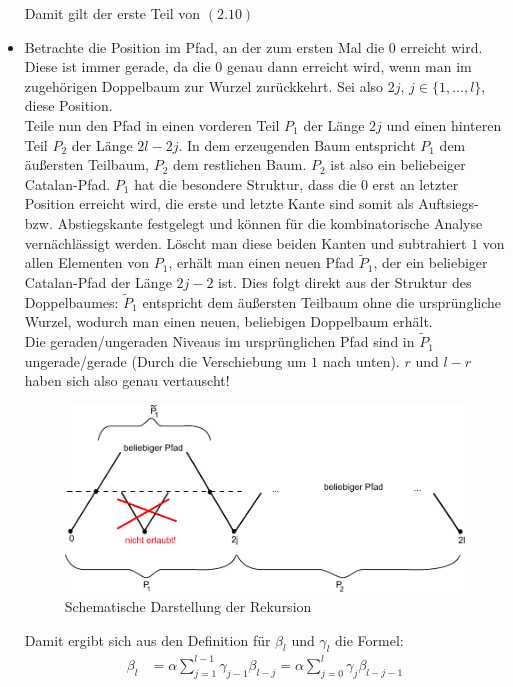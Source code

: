 \documentclass[a4paper, 11pt]{scrreprt}
\begin{document}
\begin{itemize}
Damit gilt der erste Teil von \((2.10)\)\\
\item
Betrachte die Position im Pfad, an der zum ersten Mal die \(0\) erreicht wird. Diese ist immer gerade, da die \(0\) genau dann erreicht wird, wenn man im zugehörigen Doppelbaum zur Wurzel zurückkehrt. Sei also \(2j\), \(j\in\{1,...,l\}\), diese Position. \\
Teile nun den Pfad in einen vorderen Teil \(P_1\) der Länge \(2j\) und einen hinteren Teil \(P_2\) der Länge \(2l-2j\). In dem erzeugenden Baum entspricht \(P_1\) dem äußersten Teilbaum, \(P_2\) dem restlichen Baum. \(P_2\) ist also ein beliebeiger Catalan-Pfad. \(P_1\) hat die besondere Struktur, dass die \(0\) erst an letzter Position erreicht wird, die erste und letzte Kante sind somit als Auftsiegs- bzw. Abstiegskante festgelegt und können für die kombinatorische Analyse vernächlässigt werden. Löscht man diese beiden Kanten und subtrahiert \(1\) von allen Elementen von \(P_1\), erhält man einen neuen Pfad \(\tilde{P}_1\), der ein beliebiger Catalan-Pfad der Länge \(2j-2\) ist. Dies folgt direkt aus der Struktur des Doppelbaumes: \(\tilde{P}_1\) entspricht dem äußersten Teilbaum ohne die ursprüngliche Wurzel, wodurch man einen neuen, beliebigen Doppelbaum erhält. \\
Die geraden/ungeraden Niveaus im ursprünglichen Pfad sind in \(\tilde{P}_1\) ungerade/gerade (Durch die Verschiebung um \(1\) nach unten). \(r\) und \(l-r\) haben sich also genau vertauscht!
\begin{figure}[htpb]
	\centering
	\includegraphics[width=1.00\textwidth]{Rekursion-Visualisierung.pdf}
	\caption{Schematische Darstellung der Rekursion}
\end{figure}
Damit ergibt sich aus den Definition für \(\beta_l\) und \(\gamma_l\) die Formel:
\begin{equation}
	\begin{split}
		\beta_l &= \alpha\sum_{j=1}^{l-1}\gamma_{j-1}\beta_{l-j} = \alpha\sum_{j=0}^l \gamma_j\beta_{l-j-1}\\

\end{split}
\end{equation}
\end{itemize}
\end{document}
